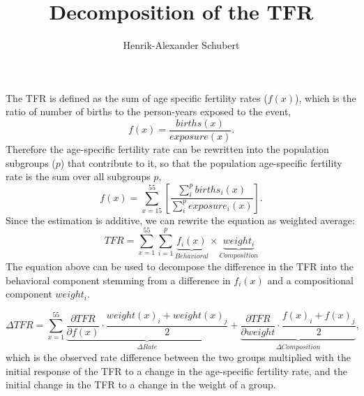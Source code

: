 \documentclass[a4paper, 12pth]{article}
\title{Decomposition of the TFR}
\author{Henrik-Alexander Schubert}
\newcommand\pd[2]{\frac{\partial #1}{\partial #2}}
\begin{document}
\maketitle

The TFR is defined as the sum of age specific fertility rates ($f(x)$), which is the ratio of number of births to the person-years exposed to the event, 
\begin{equation}
    f(x) = \frac{births(x)}{exposure(x)}.
\end{equation}
Therefore the age-specific fertility rate can be rewritten into the population subgroups ($p$) that contribute to it, so that the population age-specific fertility rate is the sum over all subgroups $p$,
\begin{equation}
  f(x) = \sum_{x=15}^{55} \left[ \frac{\sum_i^p births_i(x)}{\sum_i^p exposure_i(x)} \right].
\end{equation}
Since the estimation is additive, we can rewrite the equation as weighted average: 
\begin{equation}
    TFR = \sum_{x = 1}^{55} \sum_{i = 1}^{p} \underbrace{f_i(x)}_{Behavioral} \times \underbrace{weight_i}_{Composition}
\end{equation}
The equation above can be used to decompose the difference in the TFR into the behavioral component stemming from a difference in $f_i(x)$ and a compositional component $weight_i$.

\begin{equation}
    \Delta TFR = \sum_{x = 1}^{55}
    \underbrace{\pd{TFR}{f(x)} \cdot \frac{weight(x)_i + weight(x)_j}{2}}_{\Delta Rate} +
    \underbrace{\pd{TFR}{weight} \cdot \frac{f(x)_i + f(x)_j}{2}}_{\Delta Composition},
\end{equation}
which is the observed rate difference between the two groups multiplied with the initial response of the TFR to a change in the age-specific fertility rate, and the initial change in the TFR to a change in the weight of a group.
\end{document}
